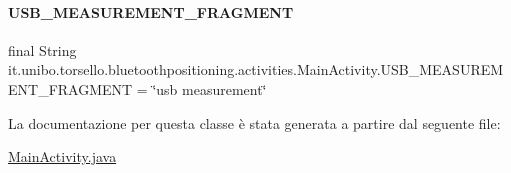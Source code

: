 \hypertarget{classit_1_1unibo_1_1torsello_1_1bluetoothpositioning_1_1activities_1_1MainActivity_a64bac06e6db556ba1e36c8773e61137b_a64bac06e6db556ba1e36c8773e61137b}{}\label{classit_1_1unibo_1_1torsello_1_1bluetoothpositioning_1_1activities_1_1MainActivity_a64bac06e6db556ba1e36c8773e61137b_a64bac06e6db556ba1e36c8773e61137b} 
\paragraph{\texorpdfstring{U\+S\+B\+\_\+\+M\+E\+A\+S\+U\+R\+E\+M\+E\+N\+T\+\_\+\+F\+R\+A\+G\+M\+E\+NT}{USB\_MEASUREMENT\_FRAGMENT}}
{\footnotesize\ttfamily final String it.\+unibo.\+torsello.\+bluetoothpositioning.\+activities.\+Main\+Activity.\+U\+S\+B\+\_\+\+M\+E\+A\+S\+U\+R\+E\+M\+E\+N\+T\+\_\+\+F\+R\+A\+G\+M\+E\+NT = \char`\"{}usb measurement\char`\"{}\hspace{0.3cm}{\ttfamily [static]}}



La documentazione per questa classe è stata generata a partire dal seguente file\+:\begin{DoxyCompactItemize}
\item 
\hyperlink{MainActivity_8java}{Main\+Activity.\+java}\end{DoxyCompactItemize}
